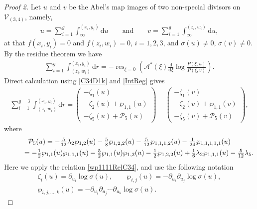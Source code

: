 \documentclass[pdftex]{sigma}
\numberwithin{equation}{section}
\DeclareMathOperator{\res}{res}
\newcommand{\rmd}{\mathrm{d}}
\begin{document}
\begin{proof}[Proof 2]
Let $u$ and $v$ be the Abel's map images of two non-special divisors on $\mathcal{V}_{(3,4)}$, namely,
\begin{gather}\label{uDefC34}
 u = \sum_{i=1}^g \int_{\infty}^{(x_i,y_i)} \rmd u \qquad \text{and}\qquad v = \sum_{i=1}^g \int_{\infty}^{(z_i,w_i)} \rmd u,
\end{gather}
at that $f(x_i,y_i)=0$ and $f(z_i,w_i)=0$, $i=1,2,3$, and $\sigma(u) \neq 0$, $\sigma(v) \neq 0$. By the residue theorem we have
\begin{gather}\label{ZetaDef}
 \sum_{i=1}^{g} \int^{(x_i,y_i)}_{(z_i,w_i)} \rmd r = -\res_{\xi=0}\left( \mathcal{A}^{\ast}(\xi) \frac{\rmd}{\rmd \xi}\log \frac{P(\xi,u)}{P(\xi,v)}\right).
\end{gather}
Direct calculation using \eqref{C34D1k} and \eqref{IntReg} gives
\begin{gather}\label{zetaC34}
 \sum_{i=1}^{g=3} \int_{(z_i,w_i)}^{(x_i,y_i)} \rmd r = \begin{pmatrix}
 -\zeta_1(u) \\
 -\zeta_2(u) + \wp_{1,1}(u)\\
 -\zeta_5(u) + \mathcal{P}_5(u) \end{pmatrix}
 - \begin{pmatrix}
 -\zeta_1(v) \\
 -\zeta_2(v) + \wp_{1,1}(v)\\
 -\zeta_5(v) + \mathcal{P}_5(v) \end{pmatrix},
\end{gather}
where
\begin{gather*}
\mathcal{P}_5(u) = -\tfrac{5}{12} \lambda_2 \wp _{1,2}(u) -\tfrac{5}{8} \wp_{1,2,2}(u)
-\tfrac{5}{12} \wp_{1,1,1,2}(u) -\tfrac{1}{24} \wp_{1,1,1,1,1}(u)
\\
\hphantom{\mathcal{P}_5(u)}{} = -\tfrac{1}{2} \wp_{1,1}(u)\wp_{1,1,1}(u) - \tfrac{5}{2} \wp_{1,1}(u)\wp_{1,2}(u)
-\tfrac{1}{2} \wp_{1,2,2}(u) + \tfrac{1}{6} \lambda_2 \wp_{1,1,1}(u) - \tfrac{5}{12}\lambda_5.
\end{gather*}
Here we apply the relation \eqref{wp1111RelC34}, and use the following notation
\begin{gather}
\zeta_{i}(u) = \partial_{u_i} \log \sigma(u),\qquad \wp_{i,j}(u) = -\partial_{u_i} \partial_{u_j} \log \sigma(u),\nonumber \\
\wp_{i,j,\dots,k}(u) = - \partial_{u_i} \partial_{u_j} \cdots \partial_{u_k} \log \sigma(u).\label{wpNot}
\end{gather}


\end{proof}
\end{document}

